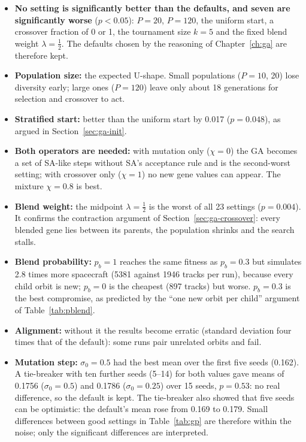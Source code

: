 \begin{itemize}
\item \textbf{No setting is significantly better than the defaults, and seven are significantly
worse} ($p<0.05$): $P=20$, $P=120$, the uniform start, a crossover fraction of 0 or 1, the tournament
size $k=5$ and the fixed blend weight $\lambda=\tfrac12$. The defaults chosen by the reasoning of
Chapter~\ref{ch:ga} are therefore kept.
\item \textbf{Population size:} the expected U-shape. Small populations ($P=10$, 20) lose diversity
early; large ones ($P=120$) leave only about 18 generations for selection and crossover to act.
\item \textbf{Stratified start:} better than the uniform start by 0.017 ($p=0.048$), as argued in
Section~\ref{sec:ga-init}.
\item \textbf{Both operators are needed:} with mutation only ($\chi=0$) the \ac{GA} becomes a set of
\ac{SA}-like steps without \ac{SA}'s acceptance rule and is the second-worst setting; with crossover
only ($\chi=1$) no new gene values can appear. The mixture $\chi=0.8$ is best.
\item \textbf{Blend weight:} the midpoint $\lambda=\tfrac12$ is the worst of all 23 settings
($p=0.004$). It confirms the contraction argument of Section~\ref{sec:ga-crossover}: every blended
gene lies between its parents, the population shrinks and the search stalls.
\item \textbf{Blend probability:} $p_b=1$ reaches the same fitness as $p_b=0.3$ but simulates
2.8 times more spacecraft (5381 against 1946 tracks per run), because every child orbit is new;
$p_b=0$ is the cheapest (897 tracks) but worse. $p_b=0.3$ is the best compromise, as predicted by the
``one new orbit per child'' argument of Table~\ref{tab:pblend}.
\item \textbf{Alignment:} without it the results become erratic (standard deviation four times that
of the default): some runs pair unrelated orbits and fail.
\item \textbf{Mutation step:} $\sigma_0=0.5$ had the best mean over the first five seeds (0.162).
A tie-breaker with ten further seeds (5--14) for both values gave means of 0.1756 ($\sigma_0=0.5$)
and 0.1786 ($\sigma_0=0.25$) over 15 seeds, $p=0.53$: no real difference, so the default is kept. The
tie-breaker also showed that five seeds can be optimistic: the default's mean rose from 0.169 to
0.179. Small differences between good settings in Table~\ref{tab:gp} are therefore within the noise;
only the significant differences are interpreted.
\end{itemize}

